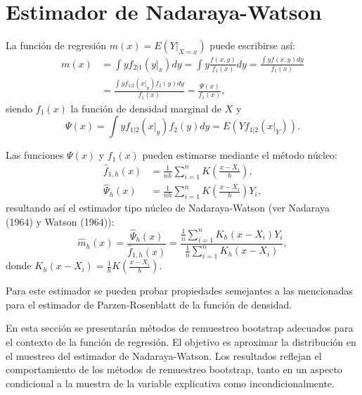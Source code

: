 \documentclass[
]{book}
\theoremstyle{break}
\theoremstyle{definition}
\theoremstyle{definition}
\theoremstyle{definition}
\theoremstyle{definition}
\theoremstyle{remark}
\begin{document}
\hypertarget{nadaraya-watson}{%
\section{Estimador de Nadaraya-Watson}\label{nadaraya-watson}}

La función de regresión \(m\left( x \right) =E\left( \left. Y\right\vert_{X=x} \right)\) puede escribirse así:
\[\begin{aligned}
m\left( x \right) &= \int yf_{2|1}\left( \left. y\right\vert _{x} \right)
dy=\int y\frac{f\left( x,y \right)}{f_1\left( x \right)}dy=\frac{\int
yf\left( x,y \right) dy}{f_1\left( x \right)} \\
&= \frac{\int yf_{1|2}\left( \left. x\right\vert _{y} \right) f_2\left(
y \right) dy}{f_1\left( x \right)}=\frac{\Psi \left( x \right)}{f_1\left(
x \right)},
\end{aligned}\]
siendo \(f_1\left( x \right)\) la función de densidad marginal de \(X\) y
\[\Psi \left( x \right) =\int yf_{1|2}\left( \left. x\right\vert _{y} \right)
f_2\left( y \right) dy=E\left( Yf_{1|2}\left( \left. x\right\vert_{Y} \right)
\right).\]

Las funciones \(\Psi \left( x \right)\) y \(f_1\left( x \right)\) pueden
estimarse mediante el método núcleo:
\[\begin{aligned}
\hat{f}_{1,h}\left( x \right) &= \frac{1}{nh}\sum_{i=1}^{n}K\left( \frac{
x-X_i}{h} \right), \\
\hat{\Psi}_{h}\left( x \right) &= \frac{1}{nh}\sum_{i=1}^{n}K\left( \frac{
x-X_i}{h} \right) Y_i,
\end{aligned}\]
resultando así el estimador tipo núcleo de Nadaraya-Watson
(ver Nadaraya (1964) y Watson (1964)):
\[\hat{m}_{h}\left( x \right) =\frac{\hat{\Psi}_{h}\left( x \right)}{\hat{f}
_{1,h}\left( x \right)}=\frac{\frac{1}{n}\sum_{i=1}^{n}K_{h}\left(
x-X_i \right) Y_i}{\frac{1}{n}\sum_{i=1}^{n}K_{h}\left( x-X_i \right)},\]
donde \(K_{h}\left( x-X_i \right) =\frac{1}{h}K\left( \frac{x-X_i}{h} \right)\).

Para este estimador se pueden probar propiedades semejantes a las
mencionadas para el estimador de Parzen-Rosenblatt de la función de
densidad.

En esta sección se presentarán métodos de remuestreo bootstrap adecuados
para el contexto de la función de regresión. El objetivo es aproximar la
distribución en el muestreo del estimador de Nadaraya-Watson. Los
resultados reflejan el comportamiento de los métodos de remuestreo
bootstrap, tanto en un aspecto condicional a la muestra de la variable
explicativa como incondicionalmente.
\end{document}
